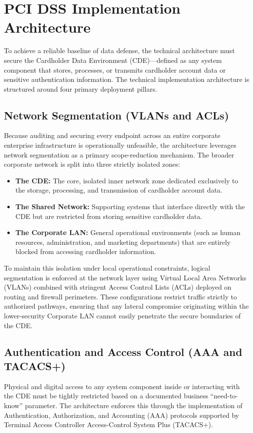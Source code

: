 \documentclass[12pt,a4paper,oneside]{report}
\begin{document}
	\section{PCI DSS Implementation Architecture}
	To achieve a reliable baseline of data defense, the technical architecture must secure the Cardholder Data Environment (CDE)—defined as any system component that stores, processes, or transmits cardholder account data or sensitive authentication information. The technical implementation architecture is structured around four primary deployment pillars.
	
	\subsection{Network Segmentation (VLANs and ACLs)}
	Because auditing and securing every endpoint across an entire corporate enterprise infrastructure is operationally unfeasible, the architecture leverages network segmentation as a primary scope-reduction mechanism. The broader corporate network is split into three strictly isolated zones:
	\begin{itemize}
		\item \textbf{The CDE:} The core, isolated inner network zone dedicated exclusively to the storage, processing, and transmission of cardholder account data.
		\item \textbf{The Shared Network:} Supporting systems that interface directly with the CDE but are restricted from storing sensitive cardholder data.
		\item \textbf{The Corporate LAN:} General operational environments (such as human resources, administration, and marketing departments) that are entirely blocked from accessing cardholder information.
	\end{itemize}
	
	To maintain this isolation under local operational constraints, logical segmentation is enforced at the network layer using Virtual Local Area Networks (VLANs) combined with stringent Access Control Lists (ACLs) deployed on routing and firewall perimeters. These configurations restrict traffic strictly to authorized pathways, ensuring that any lateral compromise originating within the lower-security Corporate LAN cannot easily penetrate the secure boundaries of the CDE.
	
	\subsection{Authentication and Access Control (AAA and TACACS+)}
	Physical and digital access to any system component inside or interacting with the CDE must be tightly restricted based on a documented business ``need-to-know'' parameter. The architecture enforces this through the implementation of Authentication, Authorization, and Accounting (AAA) protocols supported by Terminal Access Controller Access-Control System Plus (TACACS+). 
	
\end{document}
